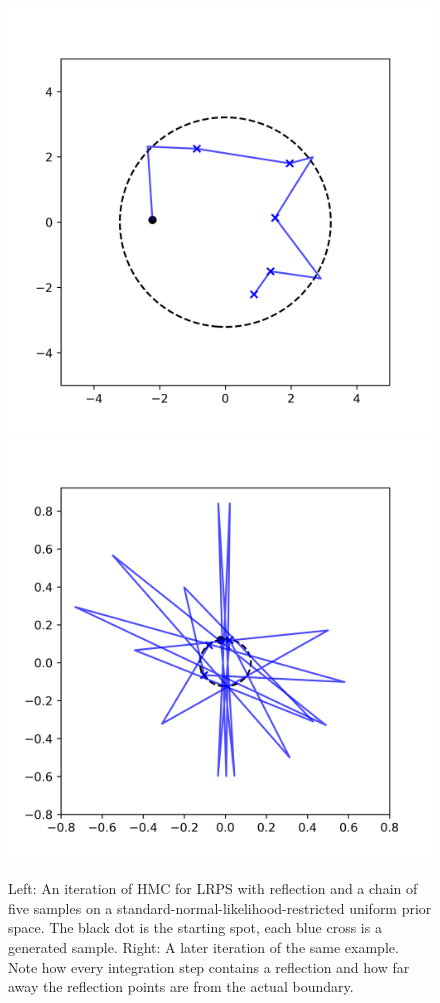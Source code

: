 \documentclass[12pt, a4paper]{report}
\begin{document}
\begin{figure}
    \centering
    \includegraphics[scale=0.45]{figs/hmc_reflection_example.png}
    \includegraphics[scale=0.45]{figs/hmc_reflection_degenerate_example.png}
    \caption{Left: An iteration of HMC for LRPS with reflection and a chain of five samples on a standard-normal-likelihood-restricted uniform prior space.
    The black dot is the starting spot, each blue cross is a generated sample. Right: A later iteration of the same example. Note how every integration step contains a reflection and how far away the reflection points are from the actual boundary.}
    \label{fig:hmc_reflection_example}
\end{figure}
\end{document}
